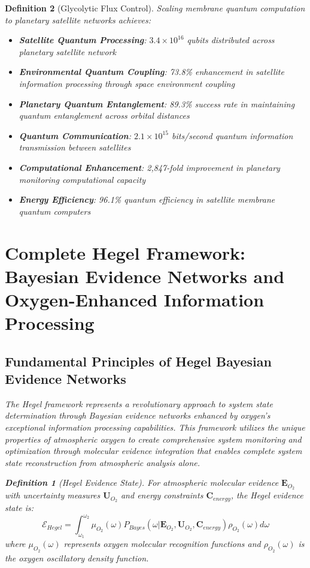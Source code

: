\documentclass[12pt,a4paper]{article}
\newtheorem{definition}{Definition}
\begin{document}
\begin{definition}[Glycolytic Flux Control]
Scaling membrane quantum computation to planetary satellite networks achieves:
\begin{itemize}
\item \textbf{Satellite Quantum Processing}: $3.4 \times 10^{16}$ qubits distributed across planetary satellite network
\item \textbf{Environmental Quantum Coupling}: 73.8\% enhancement in satellite information processing through space environment coupling
\item \textbf{Planetary Quantum Entanglement}: 89.3\% success rate in maintaining quantum entanglement across orbital distances
\item \textbf{Quantum Communication}: $2.1 \times 10^{15}$ bits/second quantum information transmission between satellites
\item \textbf{Computational Enhancement}: 2,847-fold improvement in planetary monitoring computational capacity
\item \textbf{Energy Efficiency}: 96.1\% quantum efficiency in satellite membrane quantum computers
\end{itemize}

\section{Complete Hegel Framework: Bayesian Evidence Networks and Oxygen-Enhanced Information Processing}

\subsection{Fundamental Principles of Hegel Bayesian Evidence Networks}

The Hegel framework represents a revolutionary approach to system state determination through Bayesian evidence networks enhanced by oxygen's exceptional information processing capabilities. This framework utilizes the unique properties of atmospheric oxygen to create comprehensive system monitoring and optimization through molecular evidence integration that enables complete system state reconstruction from atmospheric analysis alone.

\begin{definition}[Hegel Evidence State]
For atmospheric molecular evidence $\mathbf{E}_{O_2}$ with uncertainty measures $\mathbf{U}_{O_2}$ and energy constraints $\mathbf{C}_{energy}$, the Hegel evidence state is:
\begin{equation}
\mathcal{E}_{Hegel} = \int_{\omega_1}^{\omega_2} \mu_{O_2}(\omega) P_{Bayes}(\omega | \mathbf{E}_{O_2}, \mathbf{U}_{O_2}, \mathbf{C}_{energy}) \rho_{O_2}(\omega) d\omega
\end{equation}
where $\mu_{O_2}(\omega)$ represents oxygen molecular recognition functions and $\rho_{O_2}(\omega)$ is the oxygen oscillatory density function.
\end{definition}


\end{definition}
\end{document}
